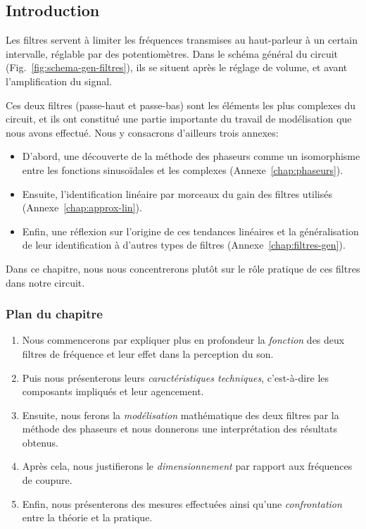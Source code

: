 \subsection*{Introduction}

Les filtres servent à limiter les fréquences transmises au haut-parleur
à un certain intervalle, réglable par des potentiomètres.
Dans le schéma général du circuit (Fig.~\ref{fig:schema-gen-filtres}),
ils se situent après le réglage de volume, et avant l'amplification du signal.

Ces deux filtres (passe-haut et passe-bas) sont les éléments les plus complexes
du circuit, et ils ont constitué
une partie importante du travail de modélisation que nous avons effectué.
Nous y consacrons d'ailleurs trois annexes:
\begin{itemize}
    \item D'abord, une découverte de la méthode des phaseurs
        comme un isomorphisme
        entre les fonctions sinusoïdales et les complexes
        (Annexe~\ref{chap:phaseurs}).
    \item Ensuite,
        l'identification linéaire par morceaux du gain des filtres utilisés
        (Annexe~\ref{chap:approx-lin}).
    \item Enfin,
        une réflexion sur l'origine de ces tendances linéaires et
        la généralisation de leur identification à d'autres types de filtres
        (Annexe~\ref{chap:filtres-gen}).
\end{itemize}

Dans ce chapitre,
nous nous concentrerons plutôt sur le rôle pratique de ces filtres
dans notre circuit.

\subsubsection*{Plan du chapitre}
\begin{enumerate}
    \item Nous commencerons par expliquer plus en profondeur la \emph{fonction}
        des deux filtres de fréquence et leur effet dans la perception du son.
    \item Puis nous présenterons leurs \emph{caractéristiques techniques},
        c'est-à-dire les composants impliqués et leur agencement.
    \item Ensuite, nous ferons la \emph{modélisation} mathématique
        des deux filtres
        par la méthode des phaseurs et nous donnerons une interprétation
		des résultats obtenus.
    \item Après cela, nous justifierons le \emph{dimensionnement} par rapport
        aux fréquences de coupure.
    \item Enfin, nous présenterons des mesures effectuées ainsi qu'une
        \emph{confrontation} entre la théorie et la pratique.
\end{enumerate}



